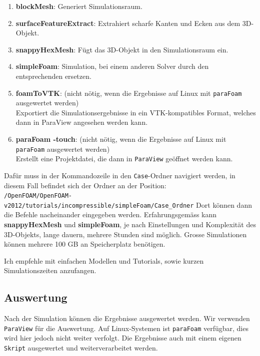\begin{enumerate}
    \item \textbf{blockMesh}: Generiert Simulationsraum.
    \item \textbf{surfaceFeatureExtract}: Extrahiert scharfe Kanten und Ecken aus dem 3D-Objekt.
    \item \textbf{snappyHexMesh}: Fügt das 3D-Objekt in den Simulationsraum ein.
    \item \textbf{simpleFoam}: Simulation, bei einem anderen Solver durch den entsprechenden ersetzen.
    \item \textbf{foamToVTK}: (nicht nötig, wenn die Ergebnisse auf Linux mit \texttt{paraFoam} ausgewertet werden)\\
    Exportiert die Simulationsergebnisse in ein VTK-kompatibles Format, welches dann in ParaView angesehen werden kann.
    \item \textbf{paraFoam -touch}: (nicht nötig, wenn die Ergebnisse auf Linux mit \texttt{paraFoam} ausgewertet werden)\\
    Erstellt eine Projektdatei, die dann in \texttt{ParaView} geöffnet werden kann.
\end{enumerate}

Dafür muss in der Kommandozeile in den \texttt{Case}-Ordner navigiert werden, in diesem Fall befindet sich der Ordner an der Position:\\
\texttt{/OpenFOAM/OpenFOAM-v2012/tutorials/incompressible/simpleFoam/\texttt{Case}\_Ordner}
Dort können dann die Befehle nacheinander eingegeben werden.
Erfahrungsgemäss kann \textbf{snappyHexMesh} und \textbf{simpleFoam}, je nach Einstellungen und Komplexität des 3D-Objekts, 
lange dauern, mehrere Stunden sind möglich.
Grosse Simulationen können mehrere 100 GB an Speicherplatz benötigen.

Ich empfehle mit einfachen Modellen und Tutorials, sowie kurzen Simulationszeiten anzufangen.

\subsection{Auswertung \label{openfoam:section:Auswertung}}
Nach der Simulation können die Ergebnisse ausgewertet werden. 
Wir verwenden \texttt{ParaView} für die Auswertung. 
Auf Linux-Systemen ist \texttt{paraFoam} verfügbar, dies wird hier jedoch nicht weiter verfolgt.
Die Ergebnisse auch mit einem eigenen \texttt{Skript} ausgewertet und weiterverarbeitet werden.

